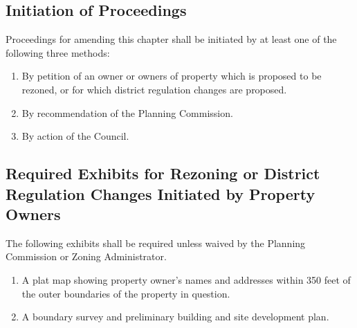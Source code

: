 \subsection{Initiation of Proceedings}
Proceedings for amending this chapter shall be initiated by at least one of the following three methods:
\begin{enumerate}[{\indent}1)]
    \item By petition of an owner or owners of property which is proposed to be rezoned, or for which district regulation changes are proposed.
    \item By recommendation of the Planning Commission.
    \item By action of the Council.
\end{enumerate}
\subsection{Required Exhibits for Rezoning or District Regulation Changes Initiated by Property Owners}
The following exhibits shall be required unless waived by the Planning Commission or Zoning Administrator.
\begin{enumerate}[{\indent}1)]
    \item A plat map showing property owner’s names and addresses within 350 feet of the outer boundaries of the property in question.
    \item A boundary survey and preliminary building and site development plan.
\end{enumerate}
